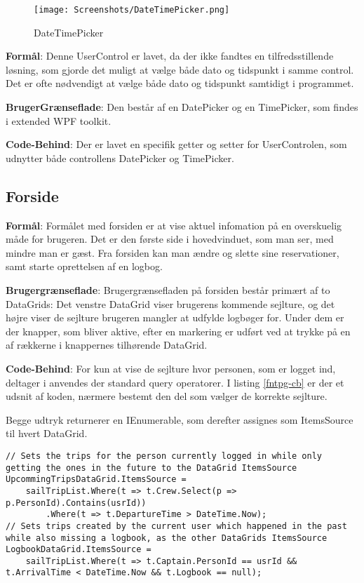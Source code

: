 \begin{wrapfigure}{r}{0.5\textwidth}
    \label{img:DateTimePicker}
    \vspace{-20pt}
    \begin{center}
        \texttt{[image: Screenshots/DateTimePicker.png]}
    \end{center}
    \vspace{-15pt}
    \caption{DateTimePicker}
    \vspace{-30pt}
\end{wrapfigure}

\textbf{Formål}: 
Denne UserControl er lavet, da der ikke fandtes en tilfredsstillende løsning, som gjorde det muligt at vælge både dato og tidspunkt i samme control. 
Det er ofte nødvendigt at vælge både dato og tidspunkt samtidigt i programmet. 

\textbf{BrugerGrænseflade}: 
Den består af en DatePicker og en TimePicker, som findes i extended WPF toolkit.

\textbf{Code-Behind}: 
Der er lavet en specifik getter og setter for UserControlen, som udnytter både controllens DatePicker og TimePicker.


\subsection{Forside}

\textbf{Formål}: 
Formålet med forsiden er at vise aktuel infomation på en overskuelig måde for brugeren.
Det er den første side i hovedvinduet, som man ser, med mindre man er gæst.
Fra forsiden kan man ændre og slette sine reservationer, samt starte oprettelsen af en logbog.

\textbf{Brugergrænseflade}: 
Brugergrænsefladen på forsiden består primært af to DataGrids: Det venstre DataGrid viser brugerens kommende sejlture, og det højre viser de sejlture brugeren mangler at udfylde logbøger for. 
Under dem er der knapper, som bliver aktive, efter en markering er udført ved at trykke på en af rækkerne i knappernes tilhørende DataGrid.

\textbf{Code-Behind}: 
For kun at vise de sejlture hvor personen, som er logget ind, deltager i anvendes der standard query operatorer. 
I listing \ref{fntpg-cb} er der et udsnit af koden, nærmere bestemt den del som vælger de korrekte sejlture.

Begge udtryk returnerer en IEnumerable, som derefter assignes som ItemsSource til hvert DataGrid.

\begin{lstlisting}[frame=single, caption=Forsidens Code-Behind, label=fntpg-cb]
// Sets the trips for the person currently logged in while only getting the ones in the future to the DataGrid ItemsSource
UpcommingTripsDataGrid.ItemsSource =
    sailTripList.Where(t => t.Crew.Select(p => p.PersonId).Contains(usrId))
        .Where(t => t.DepartureTime > DateTime.Now);
// Sets trips created by the current user which happened in the past while also missing a logbook, as the other DataGrids ItemsSource 
LogbookDataGrid.ItemsSource =
    sailTripList.Where(t => t.Captain.PersonId == usrId && t.ArrivalTime < DateTime.Now && t.Logbook == null);
\end{lstlisting}

